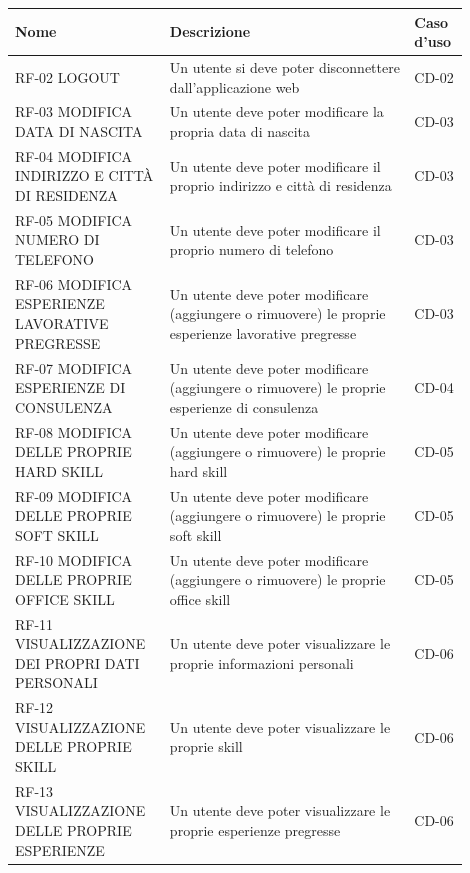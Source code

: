 \begin{center}
    \begin{tabular}{|p{0.3\linewidth}|p{0.5\linewidth}|p{0.10\linewidth}|}
    \hline
    \textbf{Nome} & \textbf{Descrizione} & \textbf{Caso d'uso} \\
    \hline
    \rowcolor{Orange}
    RF-02 LOGOUT & Un utente si deve poter disconnettere dall’applicazione web & CD-02 \\
    \hline
    \rowcolor{Orange}
    RF-03 MODIFICA DATA DI NASCITA & Un utente deve poter modificare la propria data di nascita & CD-03 \\
    \hline
    \rowcolor{DarkOrange}
    RF-04 MODIFICA INDIRIZZO E CITTÀ DI RESIDENZA & Un utente deve poter modificare il proprio indirizzo e città di residenza & CD-03 \\
    \hline
    \rowcolor{LighterOrange}
    RF-05 MODIFICA NUMERO DI TELEFONO & Un utente deve poter modificare il proprio numero di telefono & CD-03 \\
    \hline
    \rowcolor{LighterOrange}
    RF-06 MODIFICA ESPERIENZE LAVORATIVE PREGRESSE & Un utente deve poter modificare (aggiungere o rimuovere) le proprie esperienze lavorative pregresse & CD-03 \\
    \hline
    \rowcolor{LightOrange}
    RF-07 MODIFICA ESPERIENZE DI CONSULENZA & Un utente deve poter modificare (aggiungere o rimuovere) le proprie esperienze di consulenza & CD-04 \\
    \hline
    \rowcolor{DarkOrange}
    RF-08 MODIFICA DELLE PROPRIE HARD SKILL & Un utente deve poter modificare (aggiungere o rimuovere) le proprie hard skill & CD-05 \\
    \hline
    \rowcolor{Orange}
    RF-09 MODIFICA DELLE PROPRIE SOFT SKILL & Un utente deve poter modificare (aggiungere o rimuovere) le proprie soft skill & CD-05 \\
    \hline
    \rowcolor{Orange}
    RF-10 MODIFICA DELLE PROPRIE OFFICE SKILL & Un utente deve poter modificare (aggiungere o rimuovere) le proprie office skill & CD-05 \\
    \hline
    \rowcolor{LighterOrange}
    RF-11 VISUALIZZAZIONE DEI PROPRI DATI PERSONALI & Un utente deve poter visualizzare le proprie informazioni personali & CD-06 \\
    \hline
    \rowcolor{LightOrange}
    RF-12 VISUALIZZAZIONE DELLE PROPRIE SKILL & Un utente deve poter visualizzare le proprie skill & CD-06 \\
    \hline
    \rowcolor{LightOrange}
    RF-13 VISUALIZZAZIONE DELLE PROPRIE ESPERIENZE & Un utente deve poter visualizzare le proprie esperienze pregresse & CD-06 \\

\end{tabular}
\end{center}
